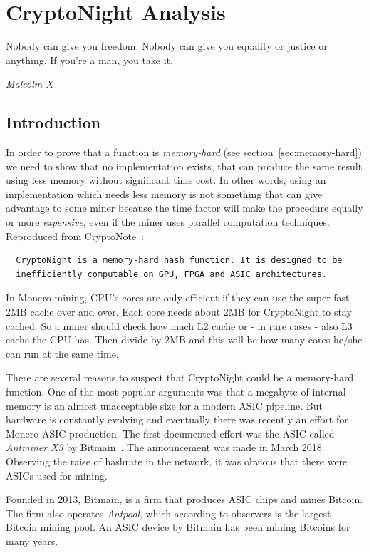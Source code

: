 \chapter{CryptoNight Analysis}
%
%
\epigraph{Nobody can give you freedom. Nobody can give you equality or justice or anything. If you're a man, you take it.}{\textit{Malcolm X}}
%
\section{Introduction}
In order to prove that a function is \hyperref[sec:memory-hard]{\emph{memory-hard}} (see \hyperref[sec:memory-hard]{section}~\ref{sec:memory-hard}) we need to show that no implementation exists, that can produce the same result using less memory without significant time cost. In other words, using an implementation which needs less memory is not something that can give advantage to some miner because the time factor will make the procedure equally or more \emph{expensive}, even if the miner uses parallel computation techniques. Reproduced from CryptoNote~\cite{cryptonight}:
\begin{verbatim}
  CryptoNight is a memory-hard hash function. It is designed to be
  inefficiently computable on GPU, FPGA and ASIC architectures.
\end{verbatim}

In Monero mining, CPU's cores are only efficient if they can use the super fast 2MB cache over and over. Each core needs about 2MB for CryptoNight to stay cached. So a miner should check how much L2 cache or - in rare cases - also L3 cache the CPU has. Then divide by 2MB and this will be how many cores he/she can run at the same time.

There are several reasons to suspect that CryptoNight could be a memory-hard function. One of the most popular arguments was that a megabyte of internal memory is an almost unacceptable size for a modern ASIC pipeline. But hardware is constantly evolving and eventually there was recently an effort for Monero ASIC production. The first documented effort was the ASIC called \emph{Antminer X3} by Bitmain~\cite{bitmain}. The announcement was made in March 2018. Observing the raise of hashrate in the network, it was obvious that there were ASICs used for mining.

Founded in 2013, Bitmain, is a firm that produces ASIC chips and mines Bitcoin. The firm also operates \emph{Antpool}, which according to observers is the largest Bitcoin mining pool. An ASIC device by Bitmain has been mining Bitcoins for many years.

